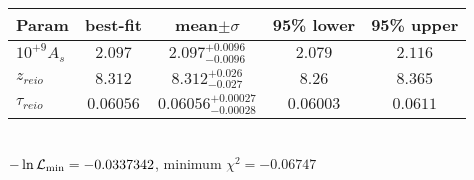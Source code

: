 \begin{tabular}{|l|c|c|c|c|} 
 \hline 
Param & best-fit & mean$\pm\sigma$ & 95\% lower & 95\% upper \\ \hline 
$10^{+9}A_{s }$ &$2.097$ & $2.097_{-0.0096}^{+0.0096}$ & $2.079$ & $2.116$ \\ 
$z_{reio }$ &$8.312$ & $8.312_{-0.027}^{+0.026}$ & $8.26$ & $8.365$ \\ 
$\tau{}_{reio }$ &$0.06056$ & $0.06056_{-0.00028}^{+0.00027}$ & $0.06003$ & $0.0611$ \\ 
\hline 
 \end{tabular} \\ 
$-\ln{\cal L}_\mathrm{min} =-0.0337342$, minimum $\chi^2=-0.06747$ \\ 
